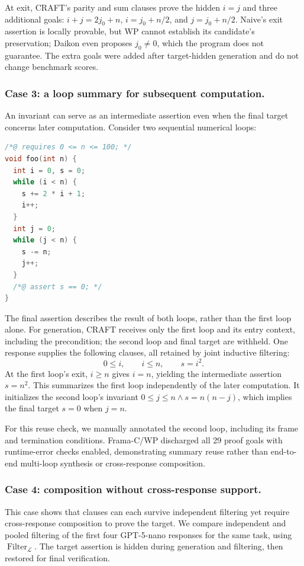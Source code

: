 At exit, CRAFT's parity and sum clauses prove the hidden \(i=j\) and three
additional goals: \(i+j=2j_0+n\), \(i=j_0+n/2\), and \(j=j_0+n/2\).
Naive's exit assertion is locally provable, but WP cannot establish its
candidate's preservation; Daikon even proposes \(j_0\ne0\), which the program
does not guarantee. The extra goals were added after target-hidden generation
and do not change benchmark scores.

\subsubsection*{Case 3: a loop summary for subsequent computation.}
An invariant can serve as an intermediate assertion even when the final
target concerns later computation. Consider two sequential numerical loops:
\begin{lstlisting}[language=C,numbers=none]
/*@ requires 0 <= n <= 100; */
void foo(int n) {
  int i = 0, s = 0;
  while (i < n) {
    s += 2 * i + 1;
    i++;
  }
  int j = 0;
  while (j < n) {
    s -= n;
    j++;
  }
  /*@ assert s == 0; */
}
\end{lstlisting}
The final assertion describes the result of both loops, rather than the
first loop alone. For generation, CRAFT receives only the first loop and its
entry context, including the precondition; the second loop and final target
are withheld. One response supplies the following clauses, all retained by
joint inductive filtering:
\[
  0\le i,\qquad i\le n,\qquad s=i^2.
\]
At the first loop's exit, \(i\ge n\) gives \(i=n\), yielding the intermediate
assertion \(s=n^2\). This summarizes the first loop independently of the
later computation. It initializes the second loop's invariant
\(0\le j\le n\land s=n(n-j)\), which implies the final target \(s=0\)
when \(j=n\).

For this reuse check, we manually annotated the second loop, including its
frame and termination conditions. Frama-C/WP discharged all 29 proof goals
with runtime-error checks enabled, demonstrating summary reuse rather than
end-to-end multi-loop synthesis or cross-response composition.

\subsubsection*{Case 4: composition without cross-response support.}
This case shows that clauses can each survive independent filtering yet
require cross-response composition to prove the target. We compare independent
and pooled filtering of the first four GPT-5-nano responses for the same task,
using \(\operatorname{Filter}_{\mathcal L}\). The target assertion is hidden
during generation and filtering, then restored for final verification.

